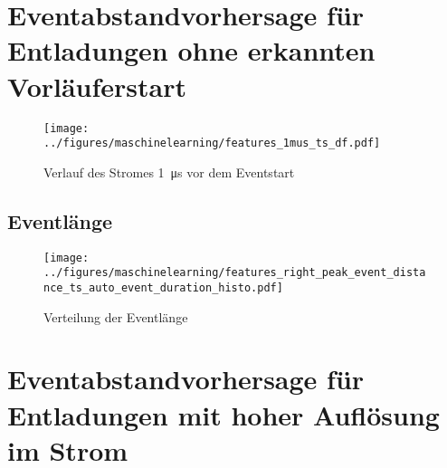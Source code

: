 \section{Eventabstandvorhersage für Entladungen ohne erkannten Vorläuferstart}

\begin{figure}[H]
    \centering
      \texttt{[image: ../figures/maschinelearning/features\_1mus\_ts\_df.pdf]}
      \caption{Verlauf des Stromes \SI{1}{\micro\second} vor dem Eventstart}
      \label{fig:1mus-current-sliece}
\end{figure}

\subsection{Eventlänge}

\begin{figure}[H]
    \centering
      \texttt{[image: ../figures/maschinelearning/features\_right\_peak\_event\_distance\_ts\_auto\_event\_duration\_histo.pdf]}
      \caption{Verteilung der Eventlänge}
      \label{fig:1mus-event-duration-box}
\end{figure}






\section{Eventabstandvorhersage für Entladungen mit hoher Auflösung im Strom}

